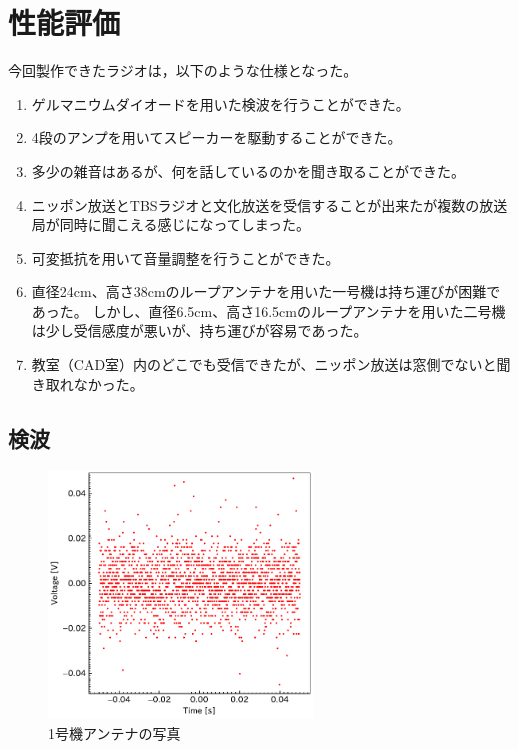 \documentclass[report.tex]{subfiles}
\begin{document}
\section{性能評価}

今回製作できたラジオは，以下のような仕様となった。

\begin{enumerate}
	\item ゲルマニウムダイオードを用いた検波を行うことができた。
	\item 4段のアンプを用いてスピーカーを駆動することができた。
	\item 多少の雑音はあるが、何を話しているのかを聞き取ることができた。
	\item ニッポン放送とTBSラジオと文化放送を受信することが出来たが複数の放送局が同時に聞こえる感じになってしまった。
	\item 可変抵抗を用いて音量調整を行うことができた。
	\item 直径24cm、高さ38cmのループアンテナを用いた一号機は持ち運びが困難であった。
	      しかし、直径6.5cm、高さ16.5cmのループアンテナを用いた二号機は少し受信感度が悪いが、持ち運びが容易であった。
	\item 教室（CAD室）内のどこでも受信できたが、ニッポン放送は窓側でないと聞き取れなかった。
\end{enumerate}

\subsection{検波}



\begin{figure}[H]
	\centering
	\includegraphics[width=7cm]{fig/koil.pdf}
	\caption{1号機アンテナの写真}
	\label{fig:koil}
\end{figure}
\end{document}
